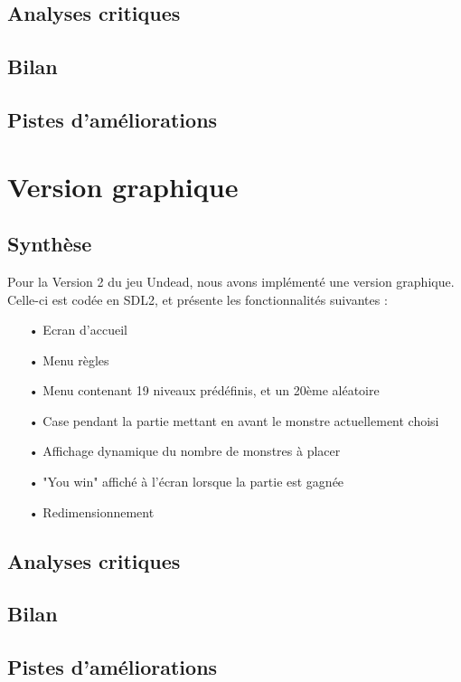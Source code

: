 \documentclass[12pt]{report}
\begin{document}
\section{Analyses critiques}
\section{Bilan}
\section{Pistes d'améliorations}

\chapter{Version graphique}
\section{Synthèse}
\begin{normalsize}
Pour la Version 2 du jeu Undead, nous avons implémenté une version graphique. Celle-ci est codée en SDL2, et présente les fonctionnalités suivantes :
\begin{itemize}
\item[•] Ecran d'accueil
\item[•] Menu règles
\item[•] Menu contenant 19 niveaux prédéfinis, et un 20ème aléatoire
\item[•] Case pendant la partie mettant en avant le monstre actuellement choisi
\item[•] Affichage dynamique du nombre de monstres à placer
\item[•] "You win" affiché à l'écran lorsque la partie est gagnée
\item[•] Redimensionnement
\end{itemize}
\end{normalsize}

\section{Analyses critiques}
\section{Bilan}
\section{Pistes d'améliorations}
\end{document}
